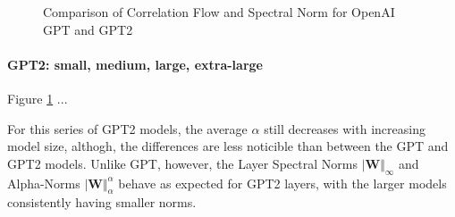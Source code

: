 \begin{figure}[t]
    \centering

    \qquad
    \qquad
    \caption{Comparison of Correlation Flow and Spectral Norm for OpenAI GPT and GPT2   }
    \label{fig:gpt-alpha-layers}
\end{figure}

\paragraph{GPT2: small, medium, large, extra-large} 

Figure \ref{fig:gpt-alpha-layers} ...

For this series of GPT2 models, the average $\alpha$ still decreases with increasing model size,
althogh, the differences are less noticible than between the GPT and GPT2 models.
Unlike GPT, however, the Layer Spectral Norms $\vert\mathbf{W}\Vert_{\infty}$ 
and Alpha-Norms $\vert\mathbf{W}\Vert_{\alpha}^{\alpha}$
 behave  as expected for GPT2 layers, with the larger models 
consistently having  smaller norms. 

